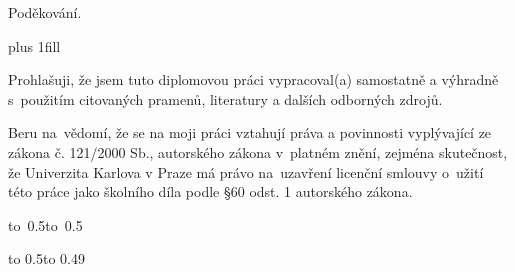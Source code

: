 \documentclass[12pt,a4paper]{report}
\let\openright=\clearpage
\begin{document}
\openright

\noindent
Poděkování.

\newpage


\vglue 0pt plus 1fill

\noindent
Prohlašuji, že jsem tuto diplomovou práci vypracoval(a) samostatně a výhradně
s~použitím citovaných pramenů, literatury a dalších odborných zdrojů.

\medskip\noindent
Beru na~vědomí, že se na moji práci vztahují práva a povinnosti vyplývající
ze zákona č. 121/2000 Sb., autorského zákona v~platném znění, zejména skutečnost,
že Univerzita Karlova v Praze má právo na~uzavření licenční smlouvy o~užití této
práce jako školního díla podle §60 odst. 1 autorského zákona.

\vspace{10mm}

\hbox{\hbox to 0.5\hbox to 0.5}

\vspace{20mm}
\newpage


\vbox to 0.5\nobreak\vbox to 0.49
\end{document}
